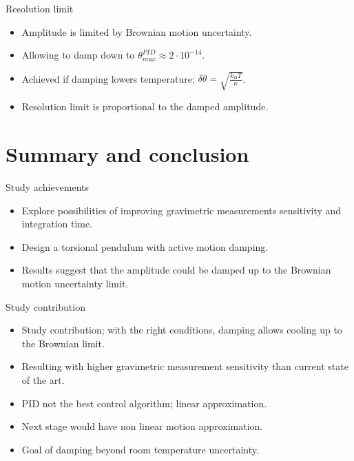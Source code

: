 \documentclass{beamer}
\begin{document}
\begin{frame}{Resolution limit}
	
	\begin{itemize}	 
		\item Amplitude is limited by Brownian motion uncertainty.
		\item Allowing to damp down to $\theta_{max}^{PID}\approx 2\cdot 10^{-14}$.
		\item Achieved if damping lowers temperature; $\delta\theta = \sqrt{\frac{k_B T}{\kappa}}$.
		\item Resolution limit is proportional to the damped amplitude. 				
				
	\end{itemize}
\end{frame}


\section{Summary and conclusion}
\begin{frame}{Study achievements}
	\begin{itemize}
		
		
		\item Explore possibilities of improving gravimetric measurements sensitivity and integration time. 
		\item Design a torsional pendulum with active motion damping. 
		\item Results suggest that the amplitude could be damped up to the Brownian motion uncertainty limit. 
		
		
	\end{itemize}
\end{frame}

\begin{frame}{Study contribution}
	\begin{itemize}
		
		\item Study contribution; with the right conditions, damping allows cooling up to the Brownian limit. 
		\item Resulting with higher gravimetric measurement sensitivity than current state of the art.
		\item PID not the best control algorithm; linear approximation. 
		\item Next stage would have non linear motion approximation.
		\item Goal of damping beyond room temperature uncertainty. 
	\end{itemize}
\end{frame}
\end{document}
